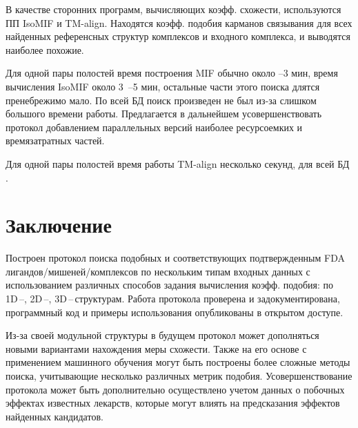 \documentclass[a4paper,14pt]{article}         %
\newcommand{\sic}[1]{\LARGE\color{orange}{#1}\color{black}\Large}
\begin{document}
В качестве сторонних программ, вычисляющих коэфф. схожести, используются ПП IsoMIF и TM-align. Находятся коэфф. подобия карманов связывания для всех найденных референсных структур комплексов и входного комплекса, и выводятся наиболее похожие.

\sic{ПРИМЕР}

Для одной пары полостей время построения MIF обычно около --3 мин, время вычисления IsoMIF около 3~--5 мин, остальные части этого поиска длятся пренебрежимо мало. По всей БД поиск произведен не был из-за слишком большого времени работы. Предлагается в дальнейшем усовершенствовать протокол добавлением параллельных версий наиболее ресурсоемких и времязатратных частей.

Для одной пары полостей время работы TM-align несколько секунд, для всей БД \sic{Сколько}.

\newpage
\section{Заключение}
Построен протокол поиска подобных и соответствующих подтвержденным FDA лигандов/мишеней/комплексов по нескольким типам входных данных с использованием различных способов задания вычисления коэфф. подобия: по 1D\,--, 2D\,--, 3D\,--\,структурам. Работа протокола проверена и задокументирована, программный код и примеры использования опубликованы в открытом доступе.

Из-за своей модульной структуры в будущем протокол может дополняться новыми вариантами нахождения меры схожести. Также на его основе с применением машинного обучения могут быть построены более сложные методы поиска, учитывающие несколько различных метрик подобия. Усовершенствование протокола может быть дополнительно осуществлено учетом данных о побочных эффектах известных лекарств, которые могут влиять на предсказания эффектов найденных кандидатов.


\newpage
\printbibliography[heading=bibintoc, title=Список использованных источников]
\end{document}
